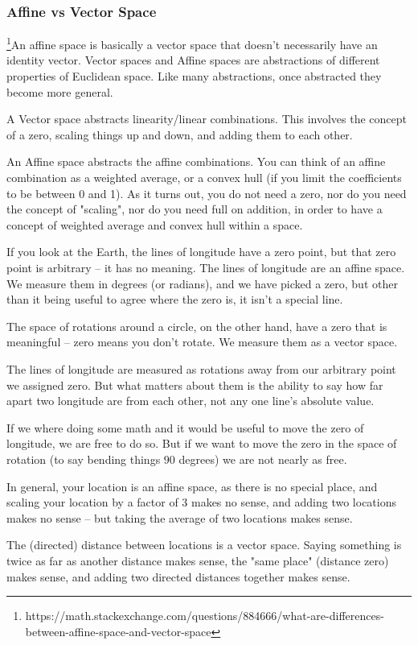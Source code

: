 \documentclass[11pt]{article}
\begin{document}
\subsubsection{Affine vs Vector Space}
\footnote{https://math.stackexchange.com/questions/884666/what-are-differences-between-affine-space-and-vector-space}An affine space is basically a vector space that doesn’t necessarily have an identity vector. Vector spaces and Affine spaces are abstractions of different properties of Euclidean space. Like many abstractions, once abstracted they become more general.

A Vector space abstracts linearity/linear combinations. This involves the concept of a zero, scaling things up and down, and adding them to each other.

An Affine space abstracts the affine combinations. You can think of an affine combination as a weighted average, or a convex hull (if you limit the coefficients to be between 0 and 1).
As it turns out, you do not need a zero, nor do you need the concept of "scaling", nor do you need full on addition, in order to have a concept of weighted average and convex hull within a space.

If you look at the Earth, the lines of longitude have a zero point, but that zero point is arbitrary -- it has no meaning. The lines of longitude are an affine space. We measure them in degrees (or radians), and we have picked a zero, but other than it being useful to agree where the zero is, it isn't a special line.

The space of rotations around a circle, on the other hand, have a zero that is meaningful -- zero means you don't rotate. We measure them as a vector space.

The lines of longitude are measured as rotations away from our arbitrary point we assigned zero. But what matters about them is the ability to say how far apart two longitude are from each other, not any one line's absolute value.

If we where doing some math and it would be useful to move the zero of longitude, we are free to do so. But if we want to move the zero in the space of rotation (to say bending things 90 degrees) we are not nearly as free.

In general, your location is an affine space, as there is no special place, and scaling your location by a factor of 3 makes no sense, and adding two locations makes no sense -- but taking the average of two locations makes sense.

The (directed) distance between locations is a vector space. Saying something is twice as far as another distance makes sense, the "same place" (distance zero) makes sense, and adding two directed distances together makes sense.
\end{document}
